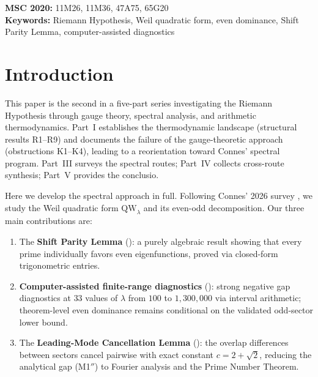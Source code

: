 \documentclass[12pt,a4paper]{article}
\theoremstyle{definition}
\theoremstyle{remark}
\begin{document}
{\footnotesize
\noindent\textbf{MSC 2020:} 11M26, 11M36, 47A75, 65G20\\
\textbf{Keywords:} Riemann Hypothesis, Weil quadratic form, even dominance, Shift Parity Lemma, computer-assisted diagnostics
}

\clearpage
\tableofcontents
\clearpage

\section{Introduction}
\label{sec:intro}

This paper is the second in a five-part series investigating the Riemann Hypothesis through gauge theory, spectral analysis, and arithmetic thermodynamics. Part~I \cite{Geiger2026partI} establishes the thermodynamic landscape (structural results R1--R9) and documents the failure of the gauge-theoretic approach (obstructions K1--K4), leading to a reorientation toward Connes' spectral program. Part~III \cite{Geiger2026partIII} surveys the spectral routes; Part~IV \cite{Geiger2026partIV} collects cross-route synthesis; Part~V \cite{Geiger2026partV} provides the conclusio.

Here we develop the spectral approach in full. Following Connes' 2026 survey \cite{Connes2026}, we study the Weil quadratic form $\mathrm{QW}_\lambda$ and its even-odd decomposition. Our three main contributions are:
\begin{enumerate}
  \item The \textbf{Shift Parity Lemma} (): a purely algebraic result showing that every prime individually favors even eigenfunctions, proved via closed-form trigonometric entries.
  \item \textbf{Computer-assisted finite-range diagnostics} (): strong negative gap diagnostics at $33$ values of $\lambda$ from $100$ to $1{,}300{,}000$ via interval arithmetic; theorem-level even dominance remains conditional on the validated odd-sector lower bound.
  \item The \textbf{Leading-Mode Cancellation Lemma} (): the overlap differences between sectors cancel pairwise with exact constant $c = 2 + \sqrt{2}$, reducing the analytical gap (M1$''$) to Fourier analysis and the Prime Number Theorem.
\end{enumerate}
\end{document}
